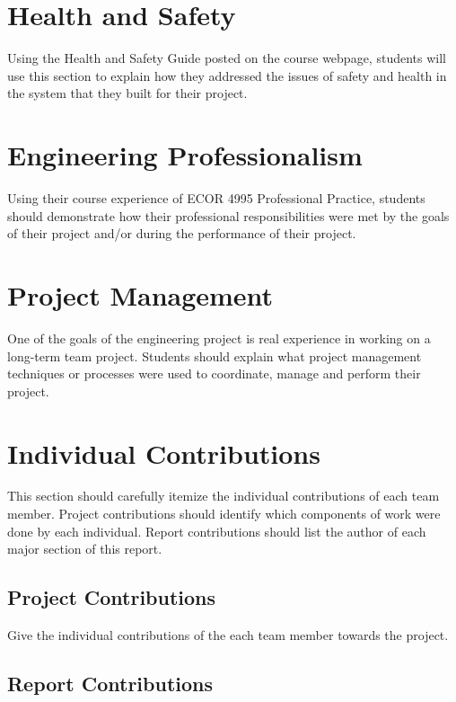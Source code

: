 \documentclass[12pt]{report}
\begin{document}
\section{Health and Safety}

Using the Health and Safety Guide posted on the course webpage, students will use this section to explain how they addressed the issues of safety and health in the system that they built for their project.


\section{Engineering Professionalism}

Using their course experience of ECOR 4995 Professional Practice, students should demonstrate how their professional responsibilities were met by the goals of their project and/or during the performance of their project. 


\section{Project Management}

One of the goals of the engineering project is real experience in working on a long-term team project.  Students should explain what project management techniques or processes were used to coordinate, manage and perform their project.


\section{Individual Contributions}

This section should carefully itemize the individual contributions of each team member. Project contributions should identify which components of work were done by each individual.  Report contributions should list the author of each major section of this report.


\subsection{Project Contributions}

Give the individual contributions of the each team member towards the project.


\subsection{Report Contributions}
\end{document}
